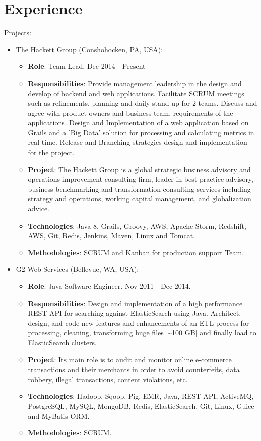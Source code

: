 \documentclass[11pt,a4paper,sans]{moderncv}        %
\begin{document}
\section{Experience}
  {
    Projects:\\
    \begin{itemize}
      \item The Hackett Group (Conshohocken, PA, USA):
        \begin{itemize}
          \item \textbf{Role}: Team Lead. Dec 2014 - Present
          \item \textbf{Responsibilities}: Provide management leadership in the design and develop of backend and web applications. Facilitate SCRUM meetings such as refinements, planning and daily stand up for 2 teams.
		Discuss and agree with product owners and business team, requirements of the applications. Design and Implementation of a web application based on Grails and a 'Big Data' solution for processing and calculating metrics in real time.
		Release and Branching strategies design and implementation for the project.
          \item \textbf{Project}: The Hackett Group is a global strategic business advisory and operations improvement consulting firm, leader in best practice advisory, business benchmarking and transformation consulting services including strategy and operations, working capital management, and globalization advice.
          \item \textbf{Technologies}: Java 8, Grails, Groovy, AWS, Apache Storm, Redshift, AWS, Git, Redis, Jenkins, Maven, Linux and Tomcat.
          \item \textbf{Methodologies}: SCRUM and Kanban for production support Team.
        \end{itemize}
      \item G2 Web Services (Bellevue, WA, USA):
        \begin{itemize}
          \item \textbf{Role}: Java Software Engineer. Nov 2011 - Dec 2014.
          \item \textbf{Responsibilities}: Design and implementation of a high performance REST API for searching against ElasticSearch using Java.
                Architect, design, and code new features and enhancements of an ETL process for processing, cleaning, transforming huge files [\textasciitilde{}100 GB] and finally load to ElasticSearch clusters. 
          \item \textbf{Project}: Its main role is to audit and monitor online e-commerce transactions and their merchants in order to avoid counterfeits, data robbery, illegal transactions, content violations, etc.
          \item \textbf{Technologies}: Hadoop, Sqoop, Pig, EMR, Java, REST API, ActiveMQ, PostgreSQL, MySQL, MongoDB, Redis, ElasticSearch, Git, Linux, Guice and MyBatis ORM.
          \item \textbf{Methodologies}: SCRUM.
        \end{itemize}
    \end{itemize}
  }
\end{document}
